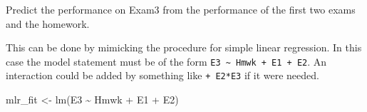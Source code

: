 \documentclass[
]{book}
\newenvironment{Shaded}{\begin{snugshade}}{\end{snugshade}}
\newcommand{\FunctionTok}[1]{\textcolor[rgb]{0.00,0.00,0.00}{#1}}
\newcommand{\NormalTok}[1]{#1}
\newcommand{\OtherTok}[1]{\textcolor[rgb]{0.56,0.35,0.01}{#1}}
\newcommand{\SpecialCharTok}[1]{\textcolor[rgb]{0.00,0.00,0.00}{#1}}
\begin{document}
Predict the performance on Exam3 from the performance of the first two exams and the homework.

This can be done by mimicking the procedure for simple linear regression. In this case the model statement must be of the form \texttt{E3\ \textasciitilde{}\ Hmwk\ +\ E1\ +\ E2}. An interaction could be added by something like \texttt{+\ E2*E3} if it were needed.

\begin{Shaded}
\begin{Highlighting}[]
\NormalTok{mlr\_fit }\OtherTok{\textless{}{-}} \FunctionTok{lm}\NormalTok{(E3 }\SpecialCharTok{\textasciitilde{}}\NormalTok{ Hmwk }\SpecialCharTok{+}\NormalTok{ E1 }\SpecialCharTok{+}\NormalTok{ E2)}
\end{Highlighting}
\end{Shaded}
\end{document}
